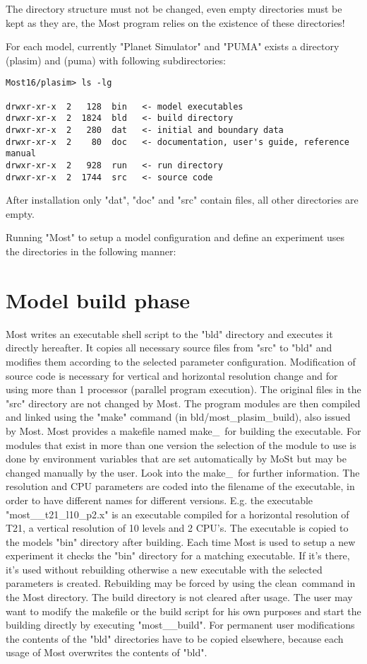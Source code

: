 The directory structure must not be changed, even empty directories must be
kept as they are, the Most program relies on the existence of these directories!

For each model, currently "Planet Simulator" and "PUMA" exists a directory
(plasim) and (puma) with following subdirectories:

\begin{verbatim}
Most16/plasim> ls -lg

drwxr-xr-x  2   128  bin   <- model executables
drwxr-xr-x  2  1824  bld   <- build directory
drwxr-xr-x  2   280  dat   <- initial and boundary data
drwxr-xr-x  2    80  doc   <- documentation, user's guide, reference manual
drwxr-xr-x  2   928  run   <- run directory
drwxr-xr-x  2  1744  src   <- source code
\end{verbatim}

After installation only "dat", "doc" and "src" contain files,
all other directories are empty.

Running "Most" to setup a model configuration and define an experiment uses the
directories in the following manner:

\section{Model build phase}

Most writes an executable shell script to the "bld" directory
and executes it directly hereafter.
It copies all necessary source files from "src" to "bld" and modifies
them according to the selected parameter configuration.
Modification of source code is necessary for vertical and horizontal
resolution change and for using more than 1 processor (parallel program
execution). The original files in the "src" directory are not changed by Most.
The program modules are then compiled and linked using the "make" command 
(in bld/most\_plasim\_build),
also issued by Most. Most provides a makefile named make\_\modir \ for
building the executable. For modules that exist in more than one
version the selection of the module to use is done by environment
variables that are set automatically by MoSt but may be changed
manually by the user. Look into the make\_\modir \ for further information.
The resolution and CPU parameters are coded into the filename of the
executable, in order to have different names for different versions.
E.g. the executable "most\_\modir\_t21\_l10\_p2.x" 
is an executable compiled for a horizontal resolution of T21, 
a vertical resolution of 10 levels and 2 CPU's.
The executable is copied to the models "bin" directory after building.
Each time Most is used to setup a new experiment it checks the "bin"
directory for a matching executable. If it's there, it's used without
rebuilding otherwise a new executable with the selected parameters
is created. Rebuilding may be forced by using the clean\modir \ command
in the Most directory.
The build directory is not cleared after usage. The user may want
to modify the makefile or the build script for his own purposes
and start the building directly by executing "most\_\modir\_build".
For permanent user modifications
the contents of the "bld" directories have to be copied elsewhere,
because each usage of Most overwrites the contents of "bld".

